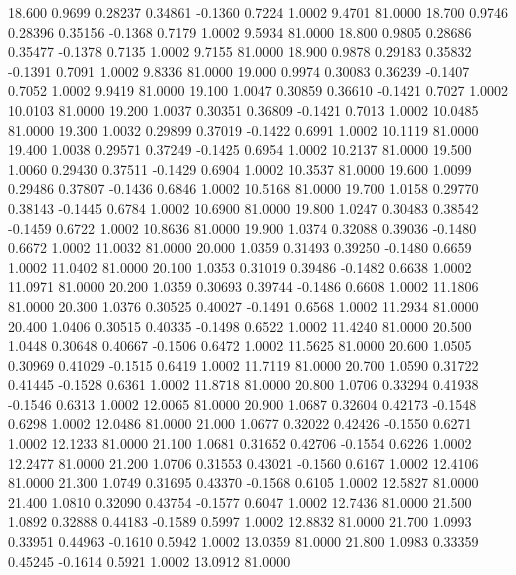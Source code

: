   18.600   0.9699   0.28237   0.34861  -0.1360   0.7224   1.0002   9.4701  81.0000
  18.700   0.9746   0.28396   0.35156  -0.1368   0.7179   1.0002   9.5934  81.0000
  18.800   0.9805   0.28686   0.35477  -0.1378   0.7135   1.0002   9.7155  81.0000
  18.900   0.9878   0.29183   0.35832  -0.1391   0.7091   1.0002   9.8336  81.0000
  19.000   0.9974   0.30083   0.36239  -0.1407   0.7052   1.0002   9.9419  81.0000
  19.100   1.0047   0.30859   0.36610  -0.1421   0.7027   1.0002  10.0103  81.0000
  19.200   1.0037   0.30351   0.36809  -0.1421   0.7013   1.0002  10.0485  81.0000
  19.300   1.0032   0.29899   0.37019  -0.1422   0.6991   1.0002  10.1119  81.0000
  19.400   1.0038   0.29571   0.37249  -0.1425   0.6954   1.0002  10.2137  81.0000
  19.500   1.0060   0.29430   0.37511  -0.1429   0.6904   1.0002  10.3537  81.0000
  19.600   1.0099   0.29486   0.37807  -0.1436   0.6846   1.0002  10.5168  81.0000
  19.700   1.0158   0.29770   0.38143  -0.1445   0.6784   1.0002  10.6900  81.0000
  19.800   1.0247   0.30483   0.38542  -0.1459   0.6722   1.0002  10.8636  81.0000
  19.900   1.0374   0.32088   0.39036  -0.1480   0.6672   1.0002  11.0032  81.0000
  20.000   1.0359   0.31493   0.39250  -0.1480   0.6659   1.0002  11.0402  81.0000
  20.100   1.0353   0.31019   0.39486  -0.1482   0.6638   1.0002  11.0971  81.0000
  20.200   1.0359   0.30693   0.39744  -0.1486   0.6608   1.0002  11.1806  81.0000
  20.300   1.0376   0.30525   0.40027  -0.1491   0.6568   1.0002  11.2934  81.0000
  20.400   1.0406   0.30515   0.40335  -0.1498   0.6522   1.0002  11.4240  81.0000
  20.500   1.0448   0.30648   0.40667  -0.1506   0.6472   1.0002  11.5625  81.0000
  20.600   1.0505   0.30969   0.41029  -0.1515   0.6419   1.0002  11.7119  81.0000
  20.700   1.0590   0.31722   0.41445  -0.1528   0.6361   1.0002  11.8718  81.0000
  20.800   1.0706   0.33294   0.41938  -0.1546   0.6313   1.0002  12.0065  81.0000
  20.900   1.0687   0.32604   0.42173  -0.1548   0.6298   1.0002  12.0486  81.0000
  21.000   1.0677   0.32022   0.42426  -0.1550   0.6271   1.0002  12.1233  81.0000
  21.100   1.0681   0.31652   0.42706  -0.1554   0.6226   1.0002  12.2477  81.0000
  21.200   1.0706   0.31553   0.43021  -0.1560   0.6167   1.0002  12.4106  81.0000
  21.300   1.0749   0.31695   0.43370  -0.1568   0.6105   1.0002  12.5827  81.0000
  21.400   1.0810   0.32090   0.43754  -0.1577   0.6047   1.0002  12.7436  81.0000
  21.500   1.0892   0.32888   0.44183  -0.1589   0.5997   1.0002  12.8832  81.0000
  21.700   1.0993   0.33951   0.44963  -0.1610   0.5942   1.0002  13.0359  81.0000
  21.800   1.0983   0.33359   0.45245  -0.1614   0.5921   1.0002  13.0912  81.0000
